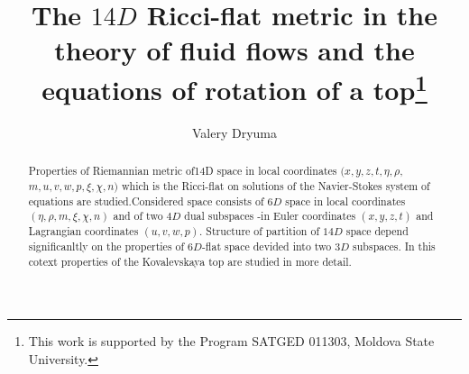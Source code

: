 \documentclass[12pt]{llncs}
\begin{document}
\fi

\title{The $14D$ Ricci-flat metric in the theory of fluid flows and the equations of rotation of a top\thanks{This work is supported by the Program SATGED 011303, Moldova State University.}}

\author{Valery Dryuma 
}

\maketitle

\begin{abstract}
 Properties of Riemannian metric of14D space in local coordinates $(x,y,z,t,\eta,\rho,$ $m,u,v,w,p,\xi,\chi,n)$ which is the Ricci-flat on solutions of the Navier-Stokes system of equations are studied.Considered space consists of $6D$ space in local coordinates $(\eta,\rho,m,\xi,\chi,n)$ and of two $4D$ dual subspaces -in Euler coordinates $(x,y,z,t)$ and Lagrangian coordinates $(u,v,w,p)$. Structure of partition of $14D$ space depend significanltly on the properties of $6D$-flat space devided into two $3D$ subspaces. In this cotext properties of the Kovalevskaya top are studied in more detail.   

\end{abstract}
\end{document}
